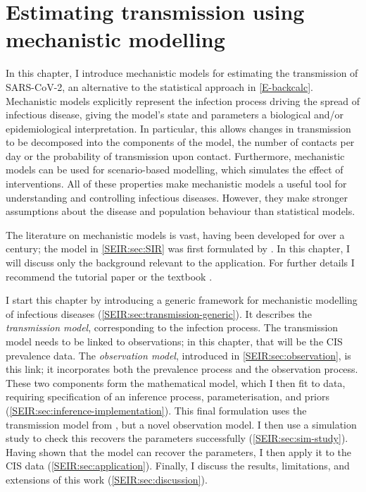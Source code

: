 \documentclass[thesis.tex]{subfiles}
\begin{document}
\ifSubfilesClassLoaded{
    \setcounter{chapter}{7}
}

\chapter{Estimating transmission using mechanistic modelling} \label{SEIR}

In this chapter, I introduce mechanistic models for estimating the transmission of SARS-CoV-2, an alternative to the statistical approach in \cref{E-backcalc}.
Mechanistic models explicitly represent the infection process driving the spread of infectious disease, giving the model's state and parameters a biological and/or epidemiological interpretation.
In particular, this allows changes in transmission to be decomposed into the components of the model, \eg the number of contacts per day or the probability of transmission upon contact.
Furthermore, mechanistic models can be used for scenario-based modelling, which simulates the effect of interventions.
All of these properties make mechanistic models a useful tool for understanding and controlling infectious diseases.
However, they make stronger assumptions about the disease and population behaviour than statistical models.

The literature on mechanistic models is vast, having been developed for over a century; the model in \cref{SEIR:sec:SIR} was first formulated by \textcite{kermackContribution}.
In this chapter, I will discuss only the background relevant to the application.
For further details I recommend the tutorial paper \textcite{kretzschmarMathematical} or the textbook \textcite{keelingModeling}.

I start this chapter by introducing a generic framework for mechanistic modelling of infectious diseases (\cref{SEIR:sec:transmission-generic}).
It describes the \emph{transmission model}, corresponding to the infection process.
The transmission model needs to be linked to observations; in this chapter, that will be the CIS prevalence data.
The \emph{observation model}, introduced in \cref{SEIR:sec:observation}, is this link; it incorporates both the prevalence process and the observation process.
These two components form the mathematical model, which I then fit to data, requiring specification of an inference process, parameterisation, and priors (\cref{SEIR:sec:inference-implementation}).
This final formulation uses the transmission model from \textcite{birrellRealtime}, but a novel observation model.
I then use a simulation study to check this recovers the parameters successfully (\cref{SEIR:sec:sim-study}).
Having shown that the model can recover the parameters, I then apply it to the CIS data (\cref{SEIR:sec:application}).
Finally, I discuss the results, limitations, and extensions of this work (\cref{SEIR:sec:discussion}).
\end{document}

